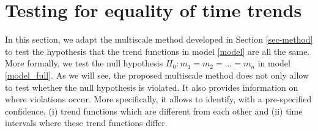 \section{Testing for equality of time trends}\label{sec-test-equality}

In this section, we adapt the multiscale method developed in Section \ref{sec-method} to test the hypothesis that the trend functions in model \eqref{model} are all the same. More formally, we test the null hypothesis $H_0: m_1 = m_2 = \ldots = m_n$ in model \eqref{model_full}. As we will see, the proposed multiscale method does not only allow to test whether the null hypothesis is violated. It also provides information on where violations occur. More specifically, it allows to identify, with a pre-specified confidence, (i) trend functions which are different from each other and (ii) time intervals where these trend functions differ.


